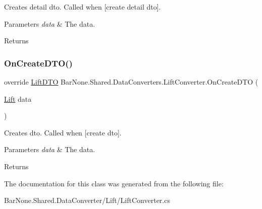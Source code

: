 Creates detail dto. Called when \mbox{[}create detail dto\mbox{]}. 


\begin{DoxyParams}{Parameters}
{\em data} & The data.\\
\hline
\end{DoxyParams}
\begin{DoxyReturn}{Returns}

\end{DoxyReturn}
\mbox{\label{class_bar_none_1_1_shared_1_1_data_converters_1_1_lift_converter_af2be6fc4e5f606c4e3bf88c8f6bfed94}} 
\subsubsection{\texorpdfstring{On\+Create\+D\+T\+O()}{OnCreateDTO()}}
{\footnotesize\ttfamily override \mbox{\hyperlink{class_bar_none_1_1_shared_1_1_data_transfer_1_1_lift_d_t_o}{Lift\+D\+TO}} Bar\+None.\+Shared.\+Data\+Converters.\+Lift\+Converter.\+On\+Create\+D\+TO (\begin{DoxyParamCaption}\item[{\mbox{\hyperlink{class_bar_none_1_1_shared_1_1_domain_model_1_1_lift}{Lift}}}]{data }\end{DoxyParamCaption})}



Creates dto. Called when \mbox{[}create dto\mbox{]}. 


\begin{DoxyParams}{Parameters}
{\em data} & The data.\\
\hline
\end{DoxyParams}
\begin{DoxyReturn}{Returns}

\end{DoxyReturn}


The documentation for this class was generated from the following file\+:\begin{DoxyCompactItemize}
\item 
Bar\+None.\+Shared.\+Data\+Converter/\+Lift/Lift\+Converter.\+cs\end{DoxyCompactItemize}
